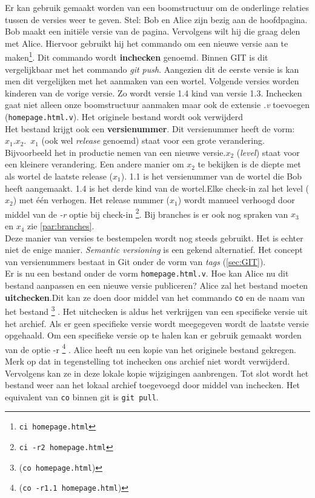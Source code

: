 Er kan gebruik gemaakt worden van een boomstructuur om de onderlinge relaties tussen de versies weer te geven. Stel: Bob en Alice zijn bezig aan de hoofdpagina. Bob maakt een initiële versie van de pagina. Vervolgens wilt hij die graag delen met Alice. Hiervoor gebruikt hij het commando om een nieuwe versie aan te maken\footnote{\Verb+ci homepage.html+}. Dit commando wordt \textbf{inchecken} genoemd. Binnen GIT is dit vergelijkbaar met het commando \textit{git push}. Aangezien dit de eerste versie is kan men dit vergelijken met het aanmaken van een wortel. Volgende versies worden kinderen van de vorige versie. Zo wordt versie 1.4 kind van versie 1.3. Inchecken gaat niet alleen onze boomstructuur aanmaken maar ook de extensie \textit{.v} toevoegen (\verb+homepage.html.v+). Het originele bestand wordt ook verwijderd\\

Het bestand krijgt ook een \textbf{versienummer}. Dit versienummer heeft de vorm: $x_1.x_2$.\ $x_1$ (ook wel \textit{release} genoemd) staat voor een grote verandering. Bijvoorbeeld het in productie nemen van een nieuwe versie.$x_2$ (\textit{level}) staat voor een kleinere verandering. Een andere manier om $x_2$ te bekijken is de diepte met als wortel de laatste release ($x_1$). 1.1 is het versienummer van de wortel die Bob heeft aangemaakt. 1.4 is het derde kind van de wortel.Elke check-in zal het level ($x_2$) met één verhogen. Het release nummer ($x_1$) wordt manueel verhoogd door middel van de \textit{-r} optie bij check-in \footnote{\Verb+ci -r2 homepage.html+}. Bij branches is er ook nog spraken van $x_3$ en $x_4$ zie \ref{par:branches}.\\

Deze manier van versies te bestempelen wordt nog steeds gebruikt. Het is echter niet de enige manier. \textit{Semantic versioning} is een gekend alternatief. Het concept van versienummers bestaat in Git onder de vorm van \textit{tags} (\ref{sec:GIT}).\\

Er is nu een bestand onder de vorm \verb+homepage.html.v+. Hoe kan Alice nu dit bestand aanpassen en een nieuwe versie publiceren? Alice zal het bestand moeten \textbf{uitchecken}.Dit kan ze doen door middel van het commando \verb+co+ en de naam van het bestand \footnote{(\Verb+co homepage.html+)} . Het uitchecken is aldus het verkrijgen van een specifieke versie uit het archief. Als er geen specifieke versie wordt meegegeven wordt de laatste versie opgehaald. Om een specifieke versie op te halen kan er gebruik gemaakt worden van de optie -r  \footnote{(\Verb+co -r1.1 homepage.html+)} . Alice heeft nu een kopie van het originele bestand gekregen. Merk op dat in tegenstelling tot inchecken ons archief niet wordt verwijderd. Vervolgens kan ze in deze lokale kopie wijzigingen aanbrengen. Tot slot wordt het bestand weer aan het lokaal archief toegevoegd door middel van inchecken. Het equivalent van \verb+co+ binnen git is \verb+git pull+.\\


